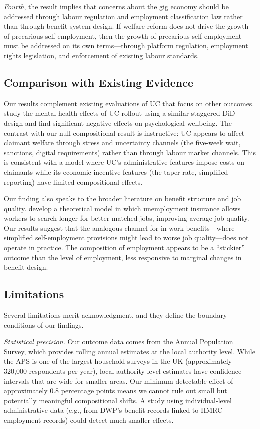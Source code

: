 \documentclass[12pt]{article}
\begin{document}
\textit{Fourth}, the result implies that concerns about the gig economy should be addressed through labour regulation and employment classification law rather than through benefit system design. If welfare reform does not drive the growth of precarious self-employment, then the growth of precarious self-employment must be addressed on its own terms---through platform regulation, employment rights legislation, and enforcement of existing labour standards.

\subsection{Comparison with Existing Evidence}

Our results complement existing evaluations of UC that focus on other outcomes. \citet{brewerUniversalCreditWelfare2024} study the mental health effects of UC rollout using a similar staggered DiD design and find significant negative effects on psychological wellbeing. The contrast with our null compositional result is instructive: UC appears to affect claimant welfare through stress and uncertainty channels (the five-week wait, sanctions, digital requirements) rather than through labour market channels. This is consistent with a model where UC's administrative features impose costs on claimants while its economic incentive features (the taper rate, simplified reporting) have limited compositional effects.

Our finding also speaks to the broader literature on benefit structure and job quality. \citet{acemogluProductivityGainsJob2001} develop a theoretical model in which unemployment insurance allows workers to search longer for better-matched jobs, improving average job quality. Our results suggest that the analogous channel for in-work benefits---where simplified self-employment provisions might lead to worse job quality---does not operate in practice. The composition of employment appears to be a ``stickier'' outcome than the level of employment, less responsive to marginal changes in benefit design.

\subsection{Limitations}

Several limitations merit acknowledgment, and they define the boundary conditions of our findings.

\textit{Statistical precision.} Our outcome data comes from the Annual Population Survey, which provides rolling annual estimates at the local authority level. While the APS is one of the largest household surveys in the UK (approximately 320,000 respondents per year), local authority-level estimates have confidence intervals that are wide for smaller areas. Our minimum detectable effect of approximately 0.8 percentage points means we cannot rule out small but potentially meaningful compositional shifts. A study using individual-level administrative data (e.g., from DWP's benefit records linked to HMRC employment records) could detect much smaller effects.
\end{document}
